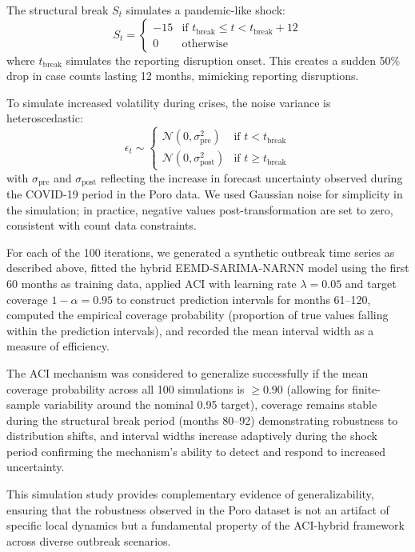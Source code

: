 \documentclass[final,3p,times,twocolumn,authoryear]{elsarticle}
\begin{document}
The structural break $S_t$ simulates a pandemic-like shock:
\begin{equation}
\label{eq:sim_break}
S_t = \begin{cases}
-15 & \text{if } t_{\text{break}} \leq t < t_{\text{break}} + 12 \\
0 & \text{otherwise}
\end{cases}
\end{equation}
where $t_{\text{break}}$ simulates the reporting disruption onset. This creates a sudden 50\% drop in case counts lasting 12 months, mimicking reporting disruptions.

To simulate increased volatility during crises, the noise variance is heteroscedastic:
\begin{equation}
\epsilon_t \sim \begin{cases}
\mathcal{N}(0, \sigma_{\text{pre}}^2) & \text{if } t < t_{\text{break}} \\
\mathcal{N}(0, \sigma_{\text{post}}^2) & \text{if } t \geq t_{\text{break}}
\end{cases}
\end{equation}
with $\sigma_{\text{pre}}$ and $\sigma_{\text{post}}$ reflecting the increase in forecast uncertainty observed during the COVID-19 period in the Poro data. We used Gaussian noise for simplicity in the simulation; in practice, negative values post-transformation are set to zero, consistent with count data constraints.

For each of the 100 iterations, we generated a synthetic outbreak time series as described above, fitted the hybrid EEMD-SARIMA-NARNN model using the first 60 months as training data, applied ACI with learning rate $\lambda = 0.05$ and target coverage $1-\alpha = 0.95$ to construct prediction intervals for months 61--120, computed the empirical coverage probability (proportion of true values falling within the prediction intervals), and recorded the mean interval width as a measure of efficiency.

The ACI mechanism was considered to generalize successfully if the mean coverage probability across all 100 simulations is $\geq 0.90$ (allowing for finite-sample variability around the nominal 0.95 target), coverage remains stable during the structural break period (months 80--92) demonstrating robustness to distribution shifts, and interval widths increase adaptively during the shock period confirming the mechanism's ability to detect and respond to increased uncertainty.

This simulation study provides complementary evidence of generalizability, ensuring that the robustness observed in the Poro dataset is not an artifact of specific local dynamics but a fundamental property of the ACI-hybrid framework across diverse outbreak scenarios.
\end{document}
